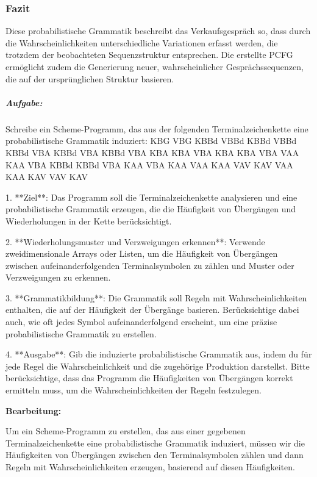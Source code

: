 \documentclass[
]{article}
\begin{document}
\subsubsection{\texorpdfstring{\textbf{Fazit}}{Fazit}}\label{fazit}

Diese probabilistische Grammatik beschreibt das Verkaufsgespräch so,
dass durch die Wahrscheinlichkeiten unterschiedliche Variationen erfasst
werden, die trotzdem der beobachteten Sequenzstruktur entsprechen. Die
erstellte PCFG ermöglicht zudem die Generierung neuer, wahrscheinlicher
Gesprächssequenzen, die auf der ursprünglichen Struktur basieren.

\subparagraph{\texorpdfstring{\textbf{Aufgabe:}}{Aufgabe:}}\label{aufgabe-3}

Schreibe ein Scheme-Programm, das aus der folgenden Terminalzeichenkette
eine probabilistische Grammatik induziert: KBG VBG KBBd VBBd KBBd VBBd
KBBd VBA KBBd VBA KBBd VBA KBA KBA VBA KBA KBA VBA VAA KAA VBA KBBd KBBd
VBA KAA VBA KAA VAA KAA VAV KAV VAA KAA KAV VAV KAV

1. **Ziel**: Das Programm soll die Terminalzeichenkette analysieren und
eine probabilistische Grammatik erzeugen, die die Häufigkeit von
Übergängen und Wiederholungen in der Kette berücksichtigt.

2. **Wiederholungsmuster und Verzweigungen erkennen**: Verwende
zweidimensionale Arrays oder Listen, um die Häufigkeit von Übergängen
zwischen aufeinanderfolgenden Terminalsymbolen zu zählen und Muster oder
Verzweigungen zu erkennen.

3. **Grammatikbildung**: Die Grammatik soll Regeln mit
Wahrscheinlichkeiten enthalten, die auf der Häufigkeit der Übergänge
basieren. Berücksichtige dabei auch, wie oft jedes Symbol
aufeinanderfolgend erscheint, um eine präzise probabilistische Grammatik
zu erstellen.

4. **Ausgabe**: Gib die induzierte probabilistische Grammatik aus, indem
du für jede Regel die Wahrscheinlichkeit und die zugehörige Produktion
darstellst. Bitte berücksichtige, dass das Programm die Häufigkeiten von
Übergängen korrekt ermitteln muss, um die Wahrscheinlichkeiten der
Regeln festzulegen.

\textbf{Bearbeitung:}

Um ein Scheme-Programm zu erstellen, das aus einer gegebenen
Terminalzeichenkette eine probabilistische Grammatik induziert, müssen
wir die Häufigkeiten von Übergängen zwischen den Terminalsymbolen zählen
und dann Regeln mit Wahrscheinlichkeiten erzeugen, basierend auf diesen
Häufigkeiten.
\end{document}

